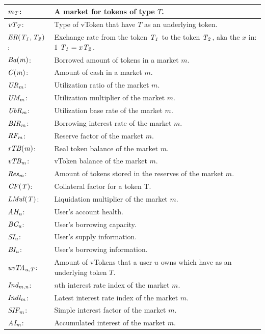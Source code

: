 \begin{tabularx}{\linewidth}{|l X|}\hline
  $\mathit{m_{T}}$: & A market for tokens of type $T$. \\\hline
  $\mathit{vT_{T}}$: & Type of vToken that have $T$ as an underlying token. \\\hline

  $\mathit{ER(\mathit{T_{1}}, \mathit{T_{2}})}$: & Exchange rate from the token $\mathit{T_{1}}$ to the token $\mathit{T_{2}}$, aka the $x$ in: $1\ \mathit{T_{1}} = x \mathit{T_{2}}$. \\\hline

  $\mathit{Ba(m)}$: & Borrowed amount of tokens in a market $m$. \\\hline
  $\mathit{C(m)}$: & Amount of cash in a market $m$. \\\hline

  $\mathit{UR_{m}}$: & Utilization ratio of the market $m$. \\\hline
  $\mathit{UM_{m}}$: & Utilization multiplier of the market $m$. \\\hline
  $\mathit{UbR_{m}}$: & Utilization base rate of the market $m$. \\\hline
  $\mathit{BIR_{m}}$: & Borrowing interest rate of the market $m$. \\\hline
  $\mathit{RF_{m}}$: & Reserve factor of the market $m$. \\\hline

  $\mathit{rTB(m)}$: & Real token balance of the market $m$. \\\hline
  $\mathit{vTB_{m}}$: & vToken balance of the market $m$. \\\hline
  $\mathit{Res_{m}}$: & Amount of tokens stored in the reserves of the market $m$. \\\hline

  $\mathit{CF(T)}$: & Collateral factor for a token T. \\\hline
  $\mathit{LMul(T)}$: & Liquidation multiplier of the market $m$. \\\hline
  $\mathit{AH_{u}}$: & User's account health. \\\hline
  $\mathit{BC_{u}}$: & User's borrowing capacity. \\\hline
  $\mathit{SI_{u}}$: & User's supply information. \\\hline
  $\mathit{BI_{u}}$: & User's borrowing information. \\\hline
  $\mathit{uvTA_{u, T}}$: & Amount of vTokens that a user $u$ owns which have as an underlying token $T$. \\\hline

  $\mathit{Ind_{m, n}}$: & $n$th interest rate index of the market $m$. \\\hline
  $\mathit{Indl_{m}}$: & Latest interest rate index of the market $m$. \\\hline
  $\mathit{SIF_{m}}$: & Simple interest factor of the market $m$. \\\hline
  $\mathit{AI_{m}}$: & Accumulated interest of the market $m$. \\\hline

\end{tabularx}
\newpage
